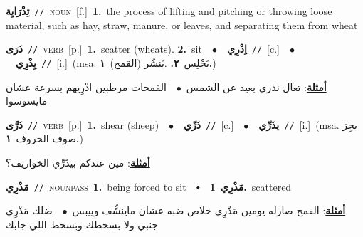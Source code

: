 \documentclass[10pt,a4paper,twoside]{article} %
\begin{document}
\begin{multicols}{2}
{\setlength\topsep{0pt}\textbf{\foreignlanguage{arabic}{تِذْرَايِة}}\ {\color{gray}\texttt{//}\color{black}}\ \textsc{noun}\ [f.]\ \textbf{1.}~the process of lifting and pitching or throwing loose material, such as hay, straw, manure, or leaves, and separating them from wheat\ } \vspace{2mm}

{\setlength\topsep{0pt}\textbf{\foreignlanguage{arabic}{ذَرَى}}\ {\color{gray}\texttt{//}\color{black}}\ \textsc{verb}\ [p.]\ \textbf{1.}~scatter (wheats).  \textbf{2.}~sit\ \ $\bullet$\ \ \setlength\topsep{0pt}\textbf{\foreignlanguage{arabic}{اِذْرِي}}\ {\color{gray}\texttt{//}\color{black}}\ [c.]\ \ $\bullet$\ \ \setlength\topsep{0pt}\textbf{\foreignlanguage{arabic}{يِذْرِي}}\ {\color{gray}\texttt{//}\color{black}}\ [i.]\ \color{gray}(msa. \foreignlanguage{arabic}{يَجْلِس}~\foreignlanguage{arabic}{\textbf{٢.}}  .\foreignlanguage{arabic}{يَنشُر (القمح)}~\foreignlanguage{arabic}{\textbf{١.}})\color{black}\  \begin{flushright}\color{gray}\foreignlanguage{arabic}{\textbf{\underline{\foreignlanguage{arabic}{أمثلة}}}: تعال نذري بعيد عن الشمس\ $\bullet$\ \  القمحات مرطبين اذْرِيهم بسرعة عشان مايسوسوا}\end{flushright}\color{black}} \vspace{2mm}

{\setlength\topsep{0pt}\textbf{\foreignlanguage{arabic}{ذَرَّى}}\ {\color{gray}\texttt{//}\color{black}}\ \textsc{verb}\ [p.]\ \textbf{1.}~shear (sheep)\ \ $\bullet$\ \ \setlength\topsep{0pt}\textbf{\foreignlanguage{arabic}{ذَرِّي}}\ {\color{gray}\texttt{//}\color{black}}\ [c.]\ \ $\bullet$\ \ \setlength\topsep{0pt}\textbf{\foreignlanguage{arabic}{يذَرِّي}}\ {\color{gray}\texttt{//}\color{black}}\ [i.]\ \color{gray}(msa. \foreignlanguage{arabic}{يجِز صوف الخروف}~\foreignlanguage{arabic}{\textbf{١.}})\color{black}\  \begin{flushright}\color{gray}\foreignlanguage{arabic}{\textbf{\underline{\foreignlanguage{arabic}{أمثلة}}}: مين عندكم بيذَرِّي الخواريف؟}\end{flushright}\color{black}} \vspace{2mm}

{\setlength\topsep{0pt}\textbf{\foreignlanguage{arabic}{مَذْرِي}}\ {\color{gray}\texttt{//}\color{black}}\ \textsc{noun\textunderscore pass}\ \textbf{1.}~being forced to sit\ \ $\smblkdiamond$\ \ \setlength\topsep{0pt}\textbf{\foreignlanguage{arabic}{مَذْرِي}}\ \textbf{1.}~scattered\  \begin{flushright}\color{gray}\foreignlanguage{arabic}{\textbf{\underline{\foreignlanguage{arabic}{أمثلة}}}: القمح صارله يومين مَذْرِي خلاص ضبه عشان ماينشِّف وييبس\ $\bullet$\ \  ضلك مَذْرِي جنبي ولا بسخطك وبسخط اللي جابك}\end{flushright}\color{black}} \vspace{2mm}


\end{multicols}
\end{document}

